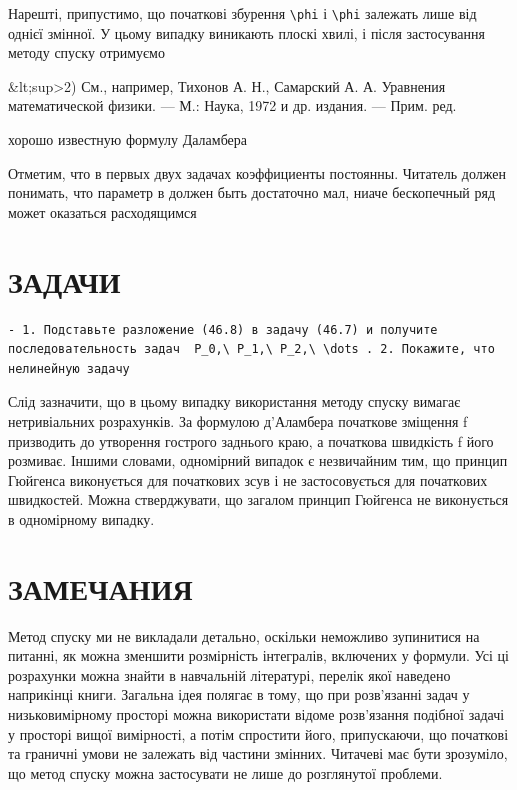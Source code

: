 \documentclass[
  ukrainian,
]{article}
\begin{document}
Нарешті, припустимо, що початкові збурення \texttt{\textbackslash{}phi}
і \texttt{\textbackslash{}phi} залежать лише від однієї змінної. У цьому
випадку виникають плоскі хвилі, і після застосування методу спуску
отримуємо

\&lt;sup\textgreater2) См., например, Тихонов А. Н., Самарский А. А.
Уравнения математической физики. --- М.: Наука, 1972 и др. издания. ---
Прим. ред.

хорошо известную формулу Даламбера

Отметим, что в первых двух задачах коэффициенты постоянны. Читатель
должен понимать, что параметр в должен быть достаточно мал, ниаче
бескопечный ряд может оказаться расходящимся

\section{ЗАДАЧИ}\label{ux437ux430ux434ux430ux447ux438-4}

\begin{verbatim}
- 1. Подставьте разложение (46.8) в задачу (46.7) и получите последовательность задач  P_0,\ P_1,\ P_2,\ \dots . 2. Покажите, что нелинейную задачу
\end{verbatim}

Слід зазначити, що в цьому випадку використання методу спуску вимагає
нетривіальних розрахунків. За формулою д'Аламбера початкове зміщення f
призводить до утворення гострого заднього краю, а початкова швидкість f
його розмиває. Іншими словами, одномірний випадок є незвичайним тим, що
принцип Гюйгенса виконується для початкових зсув і не застосовується для
початкових швидкостей. Можна стверджувати, що загалом принцип Гюйгенса
не виконується в одномірному випадку.

\section{ЗАМЕЧАНИЯ}\label{ux437ux430ux43cux435ux447ux430ux43dux438ux44f-4}

Метод спуску ми не викладали детально, оскільки неможливо зупинитися на
питанні, як можна зменшити розмірність інтегралів, включених у формули.
Усі ці розрахунки можна знайти в навчальній літературі, перелік якої
наведено наприкінці книги. Загальна ідея полягає в тому, що при
розв'язанні задач у низьковимірному просторі можна використати відоме
розв'язання подібної задачі у просторі вищої вимірності, а потім
спростити його, припускаючи, що початкові та граничні умови не залежать
від частини змінних. Читачеві має бути зрозуміло, що метод спуску можна
застосувати не лише до розглянутої проблеми.
\end{document}
